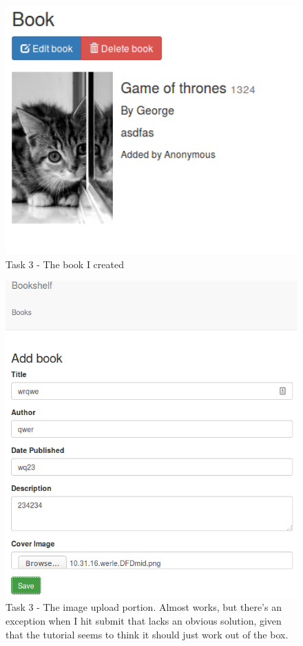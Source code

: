 \documentclass{article}
\begin{document}
	\begin{figure}[ht]
		\includegraphics[width=5in]{img/t3s3.png}
		\centering
        \caption{Task 3 - The book I created}
	\end{figure}
	\begin{figure}[ht]
		\includegraphics[width=5in]{img/t3s4.png}
		\centering
		\caption{Task 3 - The image upload portion. Almost works, but there's an exception when I hit submit that lacks an obvious solution, given that the tutorial seems to think it should just work out of the box.}
	\end{figure}
\end{document}
